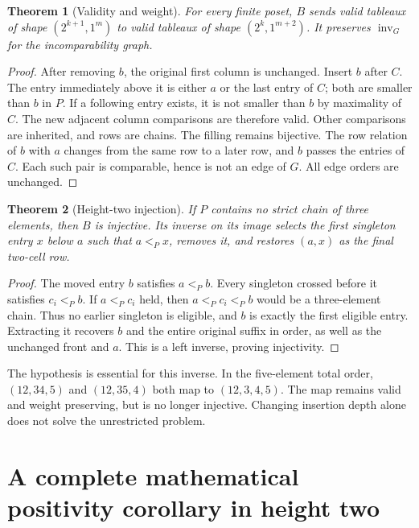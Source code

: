 \documentclass[11pt,a4paper]{article}
\newtheorem{theorem}{Theorem}[section]
\theoremstyle{definition}
\newcommand{\inv}{\operatorname{inv}}
\begin{document}
\begin{theorem}[Validity and weight]\label{thm:bubblevalid}
For every finite poset, $B$ sends valid tableaux of shape $(2^{k+1},1^m)$
to valid tableaux of shape $(2^k,1^{m+2})$. It preserves $\inv_G$ for the
incomparability graph.
\end{theorem}
\begin{proof}
After removing $b$, the original first column is unchanged. Insert $b$ after
$C$. The entry immediately above it is either $a$ or the last entry of $C$;
both are smaller than $b$ in $P$. If a following entry exists, it is not
smaller than $b$ by maximality of $C$. The new adjacent column comparisons
are therefore valid. Other comparisons are inherited, and rows are chains.
The filling remains bijective. The row relation of $b$ with $a$ changes from
the same row to a later row, and $b$ passes the entries of $C$. Each such
pair is comparable, hence is not an edge of $G$. All edge orders are unchanged.
\end{proof}

\begin{theorem}[Height-two injection]\label{thm:injection}
If $P$ contains no strict chain of three elements, then $B$ is injective.
Its inverse on its image selects the first singleton entry $x$ below $a$
such that $a<_P x$, removes it, and restores $(a,x)$ as the final two-cell row.
\end{theorem}
\begin{proof}
The moved entry $b$ satisfies $a<_P b$. Every singleton crossed before it
satisfies $c_i<_P b$. If $a<_P c_i$ held, then $a<_P c_i<_P b$ would be a
three-element chain. Thus no earlier singleton is eligible, and $b$ is
exactly the first eligible entry. Extracting it recovers $b$ and the entire
original suffix in order, as well as the unchanged front and $a$. This is a
left inverse, proving injectivity.
\end{proof}

The hypothesis is essential for this inverse. In the five-element total
order, $(12,34,5)$ and $(12,35,4)$ both map to $(12,3,4,5)$.
The map remains valid and weight preserving, but is no longer injective.
Changing insertion depth alone does not solve the unrestricted problem.

\section{A complete mathematical positivity corollary in height two}
\end{document}
